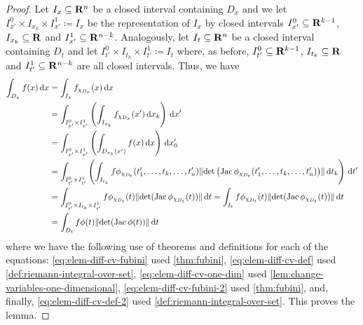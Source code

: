 \begin{proof}
    Let \(I_x \subseteq \mathbf{R}^n\) be a closed interval containing \(D_x\) and we let
    \(I_{x'}^0 \times I_{x_k} \times I_{x'}^1 \coloneq I_x\) be the representation
    of \(I_x\) by closed intervals \(I_{x'}^0 \subseteq \mathbf{R}^{k-1}\), \(I_{x_k}
    \subseteq \mathbf{R}\) and \(I_{x'}^1 \subseteq \mathbf{R}^{n-k}\). Analogously, let \(I_t
    \subseteq \mathbf{R}^n\) be a closed interval containing \(D_t\) and let \(I_{t'}^0
    \times I_{t_k} \times I_{t'}^1 \coloneq I_t\) where, as before, \(I_{t'}^0
    \subseteq \mathbf{R}^{k-1}\), \(I_{t_k} \subseteq \mathbf{R}\) and \(I_{t'}^1 \subseteq
    \mathbf{R}^{n-k}\) are all closed intervals. Thus, we have
        {\small
            \begin{align}
                \nonumber
                \int_{D_x} f(x)\, \mathrm{d} x
                 & = \int_{I_x} f_{\chi_{D_x}}(x)\, \mathrm{d} x                   \\
                \label{eq:elem-diff-cv-fubini}
                 & = \int_{I_{x'}^0 \times I_{x'}^1} \left(
                \int_{I_{x_k}} f_{\chi_{D_x}}(x')\, \mathrm{d} x_k
                \right)\, \mathrm{d} x'                                            \\
                \label{eq:elem-diff-cv-def}
                 & = \int_{I_{x'}^0 \times I_{x'}^1} \left(
                \int_{D_{x_k}(x')} f(x)\, \mathrm{d} x
                \right)\, \mathrm{d} x_0'                                          \\
                \label{eq:elem-diff-cv-one-dim}
                 & = \int_{I_{t'}^0 \times I_{t'}^1} \left(
                \int_{I_{t_k}} f\phi_{\chi_{D_t}}(t_1', \dots, t_k, \dots, t_n')
                \lVert\det\left( \operatorname{Jac} \phi_{\chi_{D_t}}(t_1', \dots, t_k, \dots, t_n')
                \right)\rVert\, \mathrm{d} t_k \right)\, \mathrm{d} t'                       \\
                \label{eq:elem-diff-cv-fubini-2}
                 & = \int_{I_{t'}^0 \times I_{t_k} \times I_{t'}^1}
                f \phi_{\chi_{D_t}}(t) \lVert\det(\operatorname{Jac} \phi_{\chi_{D_t}}(t))\rVert\, \mathrm{d} t
                = \int_{I_t}
                f \phi_{\chi_{D_t}}(t) \lVert\det(\operatorname{Jac} \phi_{\chi_{D_t}}(t))\rVert\, \mathrm{d} t
                \\
                \label{eq:elem-diff-cv-def-2}
                 & = \int_{D_t} f \phi(t) \lVert\det(\operatorname{Jac} \phi(t))\rVert\, \mathrm{d} t
            \end{align}
        }
    where we have the following use of theorems and definitions for each of the
    equations: \cref{eq:elem-diff-cv-fubini} used \cref{thm:fubini},
    \cref{eq:elem-diff-cv-def} used \cref{def:riemann-integral-over-set},
    \cref{eq:elem-diff-cv-one-dim} used \cref{lem:change-variables-one-dimensional},
    \cref{eq:elem-diff-cv-fubini-2} used \cref{thm:fubini}, and, finally,
    \cref{eq:elem-diff-cv-def-2} used \cref{def:riemann-integral-over-set}. This
    proves the lemma.
\end{proof}

